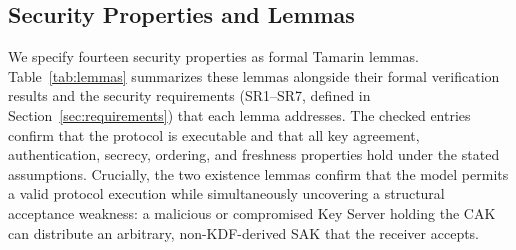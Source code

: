 \subsection{Security Properties and Lemmas}
\label{sec:properties}

\begin{sloppypar}
We specify fourteen security properties as formal Tamarin lemmas. Table~\ref{tab:lemmas} summarizes these lemmas alongside their formal verification results and the security requirements (SR1--SR7, defined in Section~\ref{sec:requirements}) that each lemma addresses. The checked entries confirm that the protocol is executable and that all key agreement, authentication, secrecy, ordering, and freshness properties hold under the stated assumptions. Crucially, the two existence lemmas confirm that the model permits a valid protocol execution while simultaneously uncovering a structural acceptance weakness: a malicious or compromised Key Server holding the CAK can distribute an arbitrary, non-KDF-derived SAK that the receiver accepts.
\end{sloppypar}


